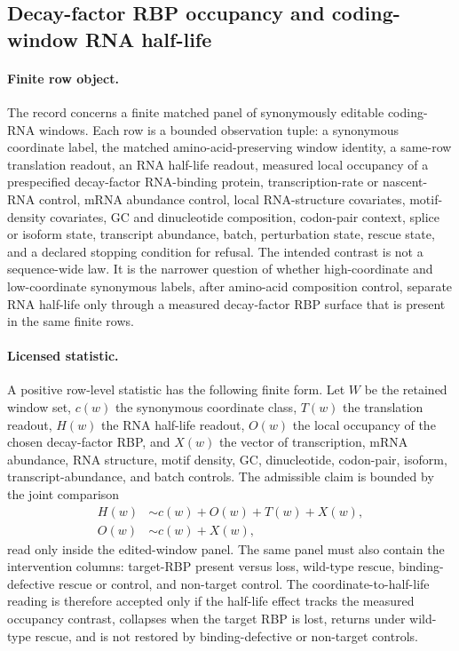 \subsection{Decay-factor RBP occupancy and coding-window RNA half-life}\label{sec:decay-factor-rbp-rna-half-life-translation-boundary}

\paragraph{Finite row object.}
The record concerns a finite matched panel of synonymously editable coding-RNA windows.  Each row is a bounded observation tuple: a synonymous coordinate label, the matched amino-acid-preserving window identity, a same-row translation readout, an RNA half-life readout, measured local occupancy of a prespecified decay-factor RNA-binding protein, transcription-rate or nascent-RNA control, mRNA abundance control, local RNA-structure covariates, motif-density covariates, GC and dinucleotide composition, codon-pair context, splice or isoform state, transcript abundance, batch, perturbation state, rescue state, and a declared stopping condition for refusal.  The intended contrast is not a sequence-wide law.  It is the narrower question of whether high-coordinate and low-coordinate synonymous labels, after amino-acid composition control, separate RNA half-life only through a measured decay-factor RBP surface that is present in the same finite rows.

\paragraph{Licensed statistic.}
A positive row-level statistic has the following finite form.  Let $W$ be the retained window set, $c(w)$ the synonymous coordinate class, $T(w)$ the translation readout, $H(w)$ the RNA half-life readout, $O(w)$ the local occupancy of the chosen decay-factor RBP, and $X(w)$ the vector of transcription, mRNA abundance, RNA structure, motif density, GC, dinucleotide, codon-pair, isoform, transcript-abundance, and batch controls.  The admissible claim is bounded by the joint comparison
$$
\begin{aligned}
H(w) &\sim c(w) + O(w) + T(w) + X(w),\\
O(w) &\sim c(w) + X(w),
\end{aligned}
$$
read only inside the edited-window panel.  The same panel must also contain the intervention columns: target-RBP present versus loss, wild-type rescue, binding-defective rescue or control, and non-target control.  The coordinate-to-half-life reading is therefore accepted only if the half-life effect tracks the measured occupancy contrast, collapses when the target RBP is lost, returns under wild-type rescue, and is not restored by binding-defective or non-target controls.

